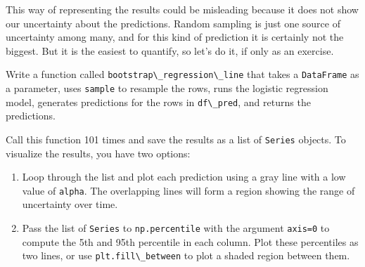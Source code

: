 This way of representing the results could be misleading because it does
not show our uncertainty about the predictions. Random sampling is just
one source of uncertainty among many, and for this kind of prediction it
is certainly not the biggest. But it is the easiest to quantify, so
let's do it, if only as an exercise.

Write a function called
\passthrough{\lstinline!bootstrap\_regression\_line!} that takes a
\passthrough{\lstinline!DataFrame!} as a parameter, uses
\passthrough{\lstinline!sample!} to resample the rows, runs the logistic
regression model, generates predictions for the rows in
\passthrough{\lstinline!df\_pred!}, and returns the predictions.

Call this function 101 times and save the results as a list of
\passthrough{\lstinline!Series!} objects. To visualize the results, you
have two options:

\begin{enumerate}
\def\labelenumi{\arabic{enumi}.}
\item
  Loop through the list and plot each prediction using a gray line with
  a low value of \passthrough{\lstinline!alpha!}. The overlapping lines
  will form a region showing the range of uncertainty over time.
\item
  Pass the list of \passthrough{\lstinline!Series!} to
  \passthrough{\lstinline!np.percentile!} with the argument
  \passthrough{\lstinline!axis=0!} to compute the 5th and 95th
  percentile in each column. Plot these percentiles as two lines, or use
  \passthrough{\lstinline!plt.fill\_between!} to plot a shaded region
  between them.
\end{enumerate}

